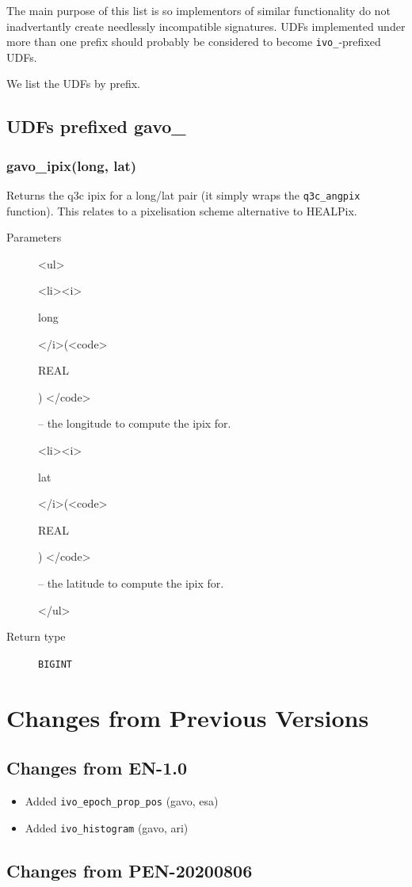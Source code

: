 \documentclass[11pt,a4paper]{ivoa}
\newenvironment{args}%
{\begin{html}<ul>\end{html}\def\arg##1(##2){\begin{html}<li><i>\end{html}%
  ##1 \begin{html}</i>(<code>\end{html}##2\begin{html}) </code>\end{html}}}%
{\begin{html}</ul>\end{html}}
\begin{document}
The main purpose of this list is so implementors of similar
functionality do not inadvertantly create needlessly incompatible
signatures.  UDFs implemented under more than one prefix should probably
be considered to become \verb|ivo_|-prefixed UDFs.

We list the UDFs by prefix.

\subsection{UDFs prefixed gavo\_}

\subsubsection{gavo\_ipix(long, lat)}

Returns the q3c ipix \citep{soft:q3c} for a long/lat pair (it simply
wraps the \texttt{q3c\_angpix} function). This relates to a pixelisation
scheme alternative to HEALPix.

\begin{description}
\item[Parameters]
\begin{args}
	\arg long (REAL) -- the longitude to compute the ipix for.
	\arg lat (REAL) -- the latitude to compute the ipix for.
\end{args}

\item[Return type] \texttt{BIGINT}
\end{description}

\section{Changes from Previous Versions}

\subsection{Changes from EN-1.0}

\begin{itemize}
\item Added \verb|ivo_epoch_prop_pos| (gavo, esa)
\item Added \verb|ivo_histogram| (gavo, ari)
\end{itemize}

\subsection{Changes from PEN-20200806}
\end{document}
